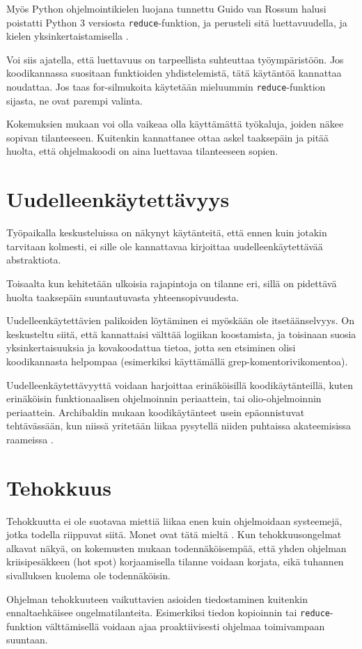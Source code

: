 Myös Python ohjelmointikielen luojana tunnettu Guido van Rossum halusi poistatti Python 3 versiosta \texttt{reduce}-funktion, ja perusteli sitä luettavuudella, ja kielen yksinkertaistamisella \cite{vanrossum2008reduce}.

Voi siis ajatella, että luettavuus on tarpeellista suhteuttaa työympäristöön. Jos koodikannassa suositaan funktioiden yhdistelemistä, tätä käytäntöä kannattaa noudattaa. Jos taas for-silmukoita käytetään mieluummin \texttt{reduce}-funktion sijasta, ne ovat parempi valinta.

Kokemuksien mukaan voi olla vaikeaa olla käyttämättä työkaluja, joiden näkee sopivan tilanteeseen. Kuitenkin kannattanee ottaa askel taaksepäin ja pitää huolta, että ohjelmakoodi on aina luettavaa tilanteeseen sopien.

\section{Uudelleenkäytettävyys}

Työpaikalla keskusteluissa on näkynyt käytänteitä, että ennen kuin jotakin tarvitaan kolmesti, ei sille ole kannattavaa kirjoittaa uudelleenkäytettävää abstraktiota.

Toisaalta kun kehitetään ulkoisia rajapintoja on tilanne eri, sillä on pidettävä huolta taaksepäin suuntautuvasta yhteensopivuudesta.

Uudelleenkäytettävien palikoiden löytäminen ei myöskään ole itsetäänselvyys. On keskusteltu siitä, että kannattaisi välttää logiikan koostamista, ja toisinaan suosia yksinkertaisuuksia ja kovakoodattua tietoa, jotta sen etsiminen olisi koodikannasta helpompaa (esimerkiksi käyttämällä grep-komentorivikomentoa).

Uudelleenkäytettävyyttä voidaan harjoittaa erinäköisillä koodikäytänteillä, kuten erinäköisin funktionaalisen ohjelmoinnin periaattein, tai olio-ohjelmoinnin periaattein. Archibaldin mukaan koodikäytänteet usein epäonnistuvat tehtävässään, kun niissä yritetään liikaa pysytellä niiden puhtaissa akateemisissa raameissa \cite{pennane_fp_gist}.



\section{Tehokkuus}
Tehokkuutta ei ole suotavaa miettiä liikaa enen kuin ohjelmoidaan systeemejä, jotka todella riippuvat siitä. Monet ovat tätä mieltä \cite{pennane_fp_gist,prematureoptimization}. Kun tehokkuusongelmat alkavat näkyä, on kokemusten mukaan todennäköisempää, että yhden ohjelman kriisipesäkkeen (hot spot) korjaamisella tilanne voidaan korjata, eikä tuhannen sivalluksen kuolema ole todennäköisin.

Ohjelman tehokkuuteen vaikuttavien asioiden tiedostaminen kuitenkin ennaltaehkäisee ongelmatilanteita. Esimerkiksi tiedon kopioinnin tai \texttt{reduce}-funktion välttämisellä voidaan ajaa proaktiivisesti ohjelmaa toimivampaan suuntaan.

